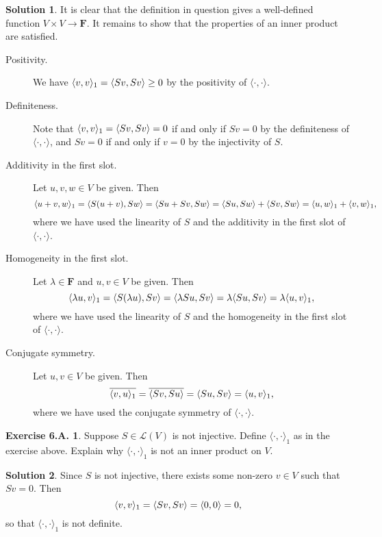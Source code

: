 \documentclass[12pt]{article}
\theoremstyle{definition}
\theoremstyle{exercise}
\newtheorem{exercise}{Exercise 6.A.}
\theoremstyle{solution}
\newtheorem*{solution}{Solution}
\newcommand{\lmap}{\mathcal{L}}
\newcommand{\ipanon}{\langle \cdot, \cdot \rangle}
\newcommand{\F}{\mathbf{F}}
\DeclarePairedDelimiter\ip{\langle}{\rangle}
\begin{document}
\begin{solution}
    It is clear that the definition in question gives a well-defined function \( V \times V \to \F \). It remains to show that the properties of an inner product are satisfied.
    \begin{description}
        \item[Positivity.] We have \( \ip{v, v}_1 = \ip{Sv, Sv} \geq 0 \) by the positivity of \( \ipanon \).

        \item[Definiteness.] Note that \( \ip{v, v}_1 = \ip{Sv, Sv} = 0 \) if and only if \( Sv = 0 \) by the definiteness of \( \ipanon \), and \( Sv = 0 \) if and only if \( v = 0 \) by the injectivity of \( S \).

        \item[Additivity in the first slot.] Let \( u, v, w \in V \) be given. Then
        \[
            \ip{u + v, w}_1 = \ip{S(u + v), Sw} = \ip{Su + Sv, Sw} = \ip{Su, Sw} + \ip{Sv, Sw} = \ip{u, w}_1 + \ip{v, w}_1,
        \]
        where we have used the linearity of \( S \) and the additivity in the first slot of \( \ipanon \).

        \item[Homogeneity in the first slot.] Let \( \lambda \in \F \) and \( u, v \in V \) be given. Then
        \[
            \ip{\lambda u, v}_1 = \ip{S(\lambda u), Sv} = \ip{\lambda Su, Sv} = \lambda \ip{Su, Sv} = \lambda \ip{u, v}_1,
        \]
        where we have used the linearity of \( S \) and the homogeneity in the first slot of \( \ipanon \).

        \item[Conjugate symmetry.] Let \( u, v \in V \) be given. Then
        \[
            \overline{\ip{v, u}_1} = \overline{\ip{Sv, Su}} = \ip{Su, Sv} = \ip{u, v}_1,
        \]
        where we have used the conjugate symmetry of \( \ipanon \).
    \end{description}
\end{solution}

\begin{exercise}
\label{ex:25}
    Suppose \( S \in \lmap(V) \) is not injective. Define \( \ipanon_1 \) as in the exercise above. Explain why \( \ipanon_1 \) is not an inner product on \( V \).
\end{exercise}

\begin{solution}
    Since \( S \) is not injective, there exists some non-zero \( v \in V \) such that \( Sv = 0 \). Then
    \[
        \ip{v, v}_1 = \ip{Sv, Sv} = \ip{0, 0} = 0,  
    \]
    so that \( \ipanon_1 \) is not definite.
\end{solution}
\end{document}
